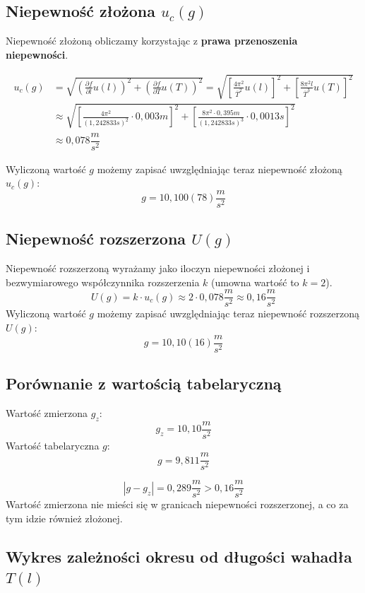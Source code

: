 \documentclass[a4paper,11pt]{article}
\begin{document}
\subsection{Niepewność złożona $u_{c}(g)$}
Niepewność złożoną obliczamy korzystając z \textbf{prawa przenoszenia niepewności}.
\begin{center}
\begin{align*}
u_{c}(g)&=\sqrt{\left(\frac{\partial f}{\partial l}u(l)\right)^{2}+\left(\frac{\partial f}{\partial T}u(T)\right)^{2}}=\sqrt{\left[\frac{4\pi^{2}}{\overline{T}^{2}}u(l)\right]^{2}+\left[\frac{8\pi^{2}l}{\overline{T}^{3}}u(T)\right]^{2}}\\
&\approx\sqrt{\left[\frac{4\pi^{2}}{(1,242833s)^{2}}\cdot0,003m\right]^{2}+\left[\frac{8\pi^{2}\cdot0,395m}{(1,242833s)^{3}}\cdot0,0013s\right]^{2}}\\
&\approx0,078\dfrac{m}{s^{2}}
\end{align*}
\end{center}

Wyliczoną wartość $g$ możemy zapisać uwzględniając teraz niepewność złożoną $u_{c}(g)$:
$$g=10,100(78)\dfrac{m}{s^{2}}$$

\subsection{Niepewność rozszerzona $U(g)$}
Niepewność rozszerzoną wyrażamy jako iloczyn niepewności złożonej i bezwymiarowego współczynnika rozszerzenia $k$ (umowna wartość to $k=2$).
$$
U(g)=k \cdot u_{c}(g)\approx 2 \cdot0,078\frac{m}{s^{2}}\approx0,16\frac{m}{s^{2}}
$$
Wyliczoną wartość $g$ możemy zapisać uwzględniając teraz niepewność rozszerzoną $U(g)$:
$$g=10,10(16)\dfrac{m}{s^{2}}$$

\subsection{Porównanie z wartością tabelaryczną}
Wartość zmierzona $g_{z}$:
$$g_{z}= 10,10\dfrac{m}{s^{2}}$$
Wartość tabelaryczna $g$:
$$g= 9,811\dfrac{m}{s^{2}}$$

$$|g-g_{z}|=0,289\dfrac{m}{s^{2}}>0,16\dfrac{m}{s^{2}}$$
Wartość zmierzona nie mieści się w granicach niepewności rozszerzonej, a co za tym idzie również złożonej.

\subsection{Wykres zależności okresu od długości wahadła $T(l)$}
\end{document}
